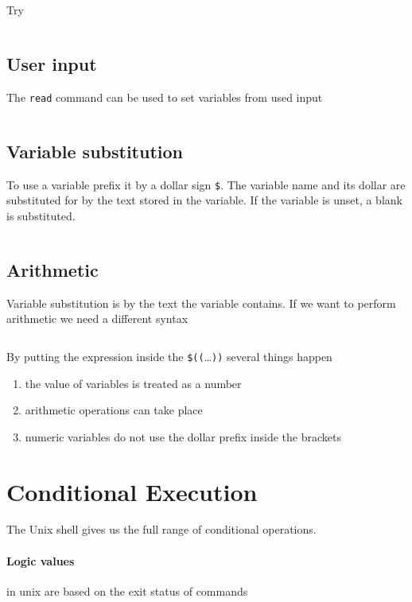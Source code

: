\documentclass{article}
\begin{document}
Try
\inputminted[frame=leftline,rulecolor=\color{Green},framerule=3pt]{bash}{scripts/varex}

\subsection{User input}
The \texttt{read} command can be used to set variables from used input
\inputminted[frame=leftline,rulecolor=\color{Green},framerule=3pt]{bash}{scripts/readex}
\subsection{Variable substitution}
To use a variable prefix it by a dollar sign \texttt{\$}.  The
variable name and its dollar are substituted for by the text stored in
the variable.  If the variable is unset, a blank is substituted.
\inputminted[frame=leftline,rulecolor=\color{Green},framerule=3pt]{bash}{scripts/blankex}

\subsection{Arithmetic}
Variable substitution is by the text the variable contains.  If we
want to perform arithmetic we need a different syntax
 \inputminted[frame=leftline,rulecolor=\color{Green},framerule=3pt]{bash}{scripts/mathex}
By putting the expression inside the \texttt{\$((}\ldots\texttt{))}
several things happen
\begin{enumerate}
\item the value of variables is treated as a number
\item arithmetic operations can take place
\item numeric variables do not use the dollar prefix inside the brackets
\end{enumerate}

\section{Conditional Execution}
The Unix shell gives us the full range of conditional operations.

\paragraph{Logic values} in unix are based on the exit status of
commands
\end{document}
